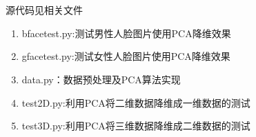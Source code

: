 \documentclass[lang=cn,a4paper,cite=authoryear]{elegantpaper}
\begin{document}
\section*{}
源代码见相关文件
\begin{enumerate}[(1)]
	\item  bfacetest.py:测试男性人脸图片使用PCA降维效果
	\item  gfacetest.py:测试女性人脸图片使用PCA降维效果
	\item  data.py：数据预处理及PCA算法实现
	\item  test2D.py:利用PCA将二维数据降维成一维数据的测试
	\item  test3D.py:利用PCA将三维数据降维成二维数据的测试
\end{enumerate}
\end{document}
